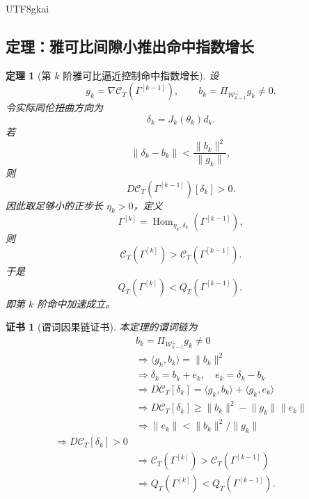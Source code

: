 \documentclass[12pt]{article}
\newtheorem{theorem}{定理}[section]
\newtheorem{Certificate}{证书}[section]
\begin{document}
\begin{CJK*}{UTF8}{gkai}
\subsection{定理：雅可比间隙小推出命中指数增长}
\label{subsec:tex55-jacgap-growth-theorem}

\begin{theorem}[第 \(k\) 阶雅可比逼近控制命中指数增长]
\label{thm:tex55-jacgap-growth}
设
\[
  g_k
  =
  \nabla\mathcal C_T(\Gamma^{[k-1]}),
  \qquad
  b_k
  =
  \Pi_{\mathcal W_{k-1}^{\perp}}g_k
  \neq0.
\]
令实际同伦扭曲方向为
\[
  \delta_k=J_k(\theta_k)d_k.
\]
若
\[
  \lVert\delta_k-b_k\rVert
  <
  \frac{\lVert b_k\rVert^2}{\lVert g_k\rVert},
\]
则
\[
  D\mathcal C_T(\Gamma^{[k-1]})[\delta_k]>0.
\]
因此取足够小的正步长 \(\eta_k>0\)，定义
\[
  \Gamma^{[k]}
  =
  \operatorname{Hom}_{\eta_k,\delta_k}
  (\Gamma^{[k-1]}),
\]
则
\[
  \mathcal C_T(\Gamma^{[k]})
  >
  \mathcal C_T(\Gamma^{[k-1]}).
\]
于是
\[
  Q_T(\Gamma^{[k]})
  <
  Q_T(\Gamma^{[k-1]}),
\]
即第 \(k\) 阶命中加速成立。
\end{theorem}

\begin{Certificate}[谓词因果链证书]
\label{cert:tex55-jacgap-growth}
本定理的谓词链为
\[
\begin{aligned}
  &b_k=\Pi_{\mathcal W_{k-1}^{\perp}}g_k\neq0\\
  &\Longrightarrow
  \langle g_k,b_k\rangle=\lVert b_k\rVert^2\\
  &\Longrightarrow
  \delta_k=b_k+e_k,\quad e_k=\delta_k-b_k\\
  &\Longrightarrow
  D\mathcal C_T[\delta_k]
  =
  \langle g_k,b_k\rangle+\langle g_k,e_k\rangle\\
  &\Longrightarrow
  D\mathcal C_T[\delta_k]
  \ge
  \lVert b_k\rVert^2-\lVert g_k\rVert\lVert e_k\rVert\\
  &\Longrightarrow
  \lVert e_k\rVert<\lVert b_k\rVert^2/\lVert g_k\rVert\\
  \Longrightarrow
  D\mathcal C_T[\delta_k]>0\\
  &\Longrightarrow
  \mathcal C_T(\Gamma^{[k]})
  >
  \mathcal C_T(\Gamma^{[k-1]})\\
  &\Longrightarrow
  Q_T(\Gamma^{[k]})
  <
  Q_T(\Gamma^{[k-1]}).
\end{aligned}
\]
\end{Certificate}


\end{CJK*}
\end{document}
